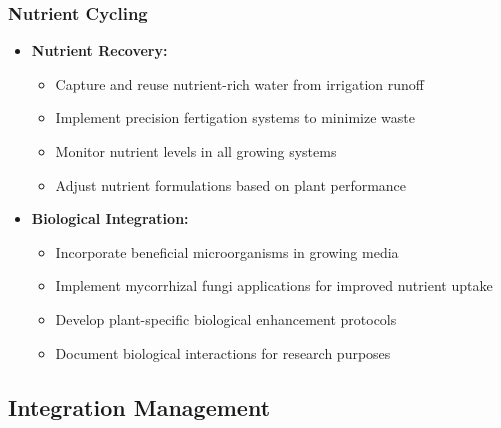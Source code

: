 \subsubsection{Nutrient Cycling}
\begin{itemize}
    \item \textbf{Nutrient Recovery:}
    \begin{itemize}
        \item Capture and reuse nutrient-rich water from irrigation runoff
        \item Implement precision fertigation systems to minimize waste
        \item Monitor nutrient levels in all growing systems
        \item Adjust nutrient formulations based on plant performance
    \end{itemize}
    
    \item \textbf{Biological Integration:}
    \begin{itemize}
        \item Incorporate beneficial microorganisms in growing media
        \item Implement mycorrhizal fungi applications for improved nutrient uptake
        \item Develop plant-specific biological enhancement protocols
        \item Document biological interactions for research purposes
    \end{itemize}
\end{itemize}

\subsection{Integration Management}

